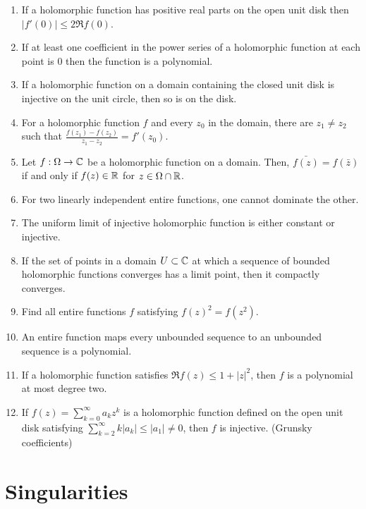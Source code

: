 \documentclass{../../large}
\begin{document}
\begin{enumerate}
\item If a holomorphic function has positive real parts on the open unit disk then $|f'(0)|\le2\Re f(0)$.
\item If at least one coefficient in the power series of a holomorphic function at each point is 0 then the function is a polynomial.
\item If a holomorphic function on a domain containing the closed unit disk is injective on the unit circle, then so is on the disk.
\item For a holomorphic function $f$ and every $z_0$ in the domain, there are $z_1\ne z_2$ such that $\frac{f(z_1)-f(z_2)}{z_1-z_2}=f'(z_0)$.
\item Let $f:\Omega\to\mathbb{C}$ be a holomorphic function on a domain. Then, $\bar{f(z)}=f(\bar z)$ if and only if $f(z)\in\mathbb{R}$ for $z\in\Omega\cap\mathbb{R}$.
\item For two linearly independent entire functions, one cannot dominate the other.
\item The uniform limit of injective holomorphic function is either constant or injective.
\item If the set of points in a domain $U\subset\mathbb{C}$ at which a sequence of bounded holomorphic functions converges has a limit point, then it compactly converges.
\item Find all entire functions $f$ satisfying $f(z)^2=f(z^2)$.
\item An entire function maps every unbounded sequence to an unbounded sequence is a polynomial.
\item If a holomorphic function satisfies $\Re f(z)\le1+|z|^2$, then $f$ is a polynomial at most degree two.
\item If $f(z)=\sum_{k=0}^\infty a_kz^k$ is a holomorphic function defined on the open unit disk satisfying $\sum_{k=2}^\infty k|a_k|\le|a_1|\ne0$, then $f$ is injective. (Grunsky coefficients)
\end{enumerate}







\chapter{Singularities}
\end{document}
